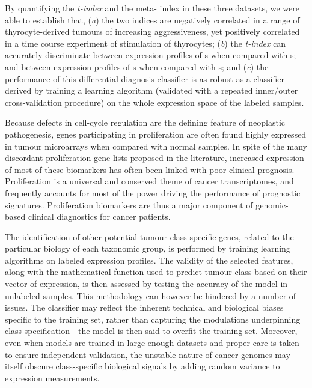 By quantifying the \emph{t-index} and the meta- index in these
three datasets, we were able to establish that, (\emph{a}) the two indices are
negatively correlated in a range of thyrocyte-derived tumours of increasing
aggressiveness, yet positively correlated in a time course experiment of
 stimulation of thyrocytes; (\emph{b}) the \emph{t-index} can
accurately discriminate between expression profiles of s when
compared with s; and between expression profiles of
s when compared with s; and (\emph{c}) the
performance of this differential diagnosis classifier is as robust as a
classifier derived by training a  learning algorithm (validated
with a repeated inner/outer cross-validation procedure) on the whole expression
space of the labeled samples.

\medskip

Because defects in cell-cycle regulation are the defining feature of neoplastic
pathogenesis, genes participating in proliferation are often found highly
expressed in tumour microarrays when compared with normal samples.  In spite of
the many discordant proliferation gene lists proposed in the
literature,\cite{whitfield_common_2006} increased expression of most of these
biomarkers has often been linked with poor clinical
prognosis.\cite{dai_cell_2005,paik_multigene_2004,rosenwald_proliferation_2003,sorlie_gene_2001}
Proliferation is a universal and conserved theme of cancer
transcriptomes,\cite{rhodes_large-scale_2004} and frequently accounts for most
of the power driving the performance of prognostic
signatures.\cite{sole_biological_2009,venet_most_2011,wirapati_meta-analysis_2008}
Proliferation biomarkers are thus a major component of genomic-based clinical
diagnostics for cancer patients.

The identification of other potential tumour class-specific genes, related to
the particular biology of each taxonomic group, is performed by training
learning algorithms on labeled expression profiles.  The validity of the
selected features, along with the mathematical function used to predict tumour
class based on their vector of expression, is then assessed by testing the
accuracy of the model in unlabeled samples.\cite{simon_diagnostic_2003} This
methodology can however be hindered by a number of
issues.\cite{brenton_molecular_2005} The classifier may reflect the inherent
technical and biological biases specific to the training set, rather than
capturing the modulations underpinning class specification---the model is then
said to overfit the training set.  Moreover, even when models are trained in
large enough datasets and proper care is taken to ensure independent validation,
the unstable nature of cancer genomes may itself obscure class-specific
biological signals by adding random variance to expression measurements.

